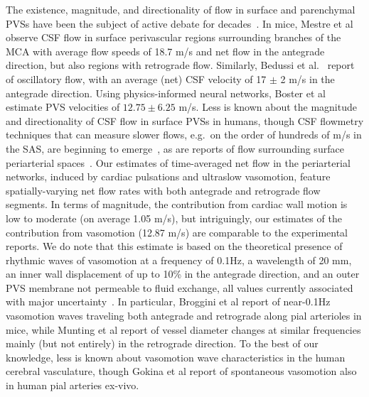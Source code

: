 \documentclass[fleqn,10pt]{wlscirep}
\begin{document}
The existence, magnitude, and directionality of flow in surface and
parenchymal PVSs have been the subject of active debate for
decades~\cite{rennels1985evidence, bilston2003arterial,
  hadaczek2006perivascular, carare2008solutes, iliff2012paravascular,
  iliff2013cerebral, bakker2016lymphatic, mestre2018flow,
  bedussi2018paravascular, rey2018pulsatile, thomas2019fluid,
  daversin2020mechanisms, kedarasetti2020functional,
  martinac2021phase, vanveluw2020vasomotion, bohr2022glymphatic,
  boster2023artificial, gjerde2023directional,
  nozaleda2024arterial}. In mice, Mestre et al~\cite{mestre2018flow}
observe CSF flow in surface perivascular regions surrounding branches
of the MCA with average flow speeds of 18.7 \textmu m/s and net flow
in the antegrade direction, but also regions with retrograde
flow. Similarly, Bedussi et al.~\cite{bedussi2018paravascular} report
of oscillatory flow, with an average (net) CSF velocity of 17 $\pm$ 2
\textmu m/s in the antegrade direction. Using physics-informed neural
networks, Boster et al~\cite{boster2023artificial} estimate PVS
velocities of $12.75 \pm 6.25$ \textmu m/s. Less is known about the
magnitude and directionality of CSF flow in surface PVSs in humans,
though CSF flowmetry techniques that can measure slower flows, e.g.~on
the order of hundreds of \textmu m/s in the SAS, are beginning to
emerge~\cite{dong2025quantifying}, as are reports of flow surrounding
surface periarterial spaces~\cite{vikner2025imaging}. Our estimates of
time-averaged net flow in the periarterial networks, induced by
cardiac pulsations and ultraslow vasomotion, feature spatially-varying
net flow rates with both antegrade and retrograde flow segments. In
terms of magnitude, the contribution from cardiac wall motion is low
to moderate (on average 1.05 \textmu m/s), but intriguingly, our
estimates of the contribution from vasomotion (12.87 \textmu m/s) are
comparable to the experimental reports. We do note that this estimate
is based on the theoretical presence of rhythmic waves of vasomotion
at a frequency of 0.1Hz, a wavelength of 20 mm, an inner wall
displacement of up to 10\% in the antegrade direction, and an outer
PVS membrane not permeable to fluid exchange, all values currently
associated with major uncertainty~\cite{gokina1996electrical,
  vanveluw2020vasomotion, munting2023spontaneous,
  broggini2024long}. In particular, Broggini et
al\cite{broggini2024long} report of near-0.1Hz vasomotion waves
traveling both antegrade and retrograde along pial arterioles in mice,
while Munting et al\cite{munting2023spontaneous} report of vessel
diameter changes at similar frequencies mainly (but not entirely) in
the retrograde direction. To the best of our knowledge, less is known
about vasomotion wave characteristics in the human cerebral
vasculature, though Gokina et al\cite{gokina1996electrical} report of
spontaneous vasomotion also in human pial arteries ex-vivo.
\end{document}

